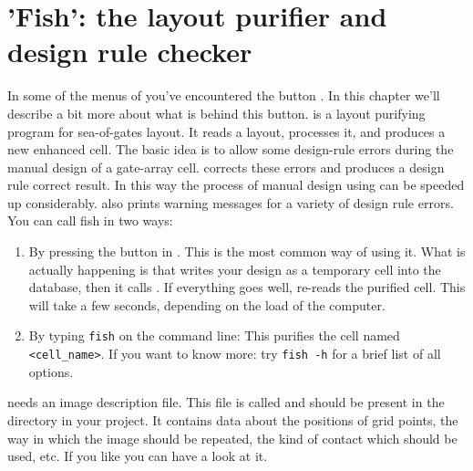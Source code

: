\chapter{'Fish': the layout purifier and design rule checker}
\label{fish}
In some of the menus of  you've encountered the button
. In this chapter we'll describe a bit more
about what is behind this button.
 is a layout purifying program for sea-of-gates layout.
It reads a layout, processes it, and produces a new enhanced cell. The
basic idea is to allow some design-rule errors during the manual design
of a gate-array cell.
 corrects these errors and produces a design rule correct result.
In this way the process of manual design using  can be
speeded up considerably.  also prints warning messages for a
variety of design rule errors.  You can call fish in two ways:
\begin{enumerate}
\item
By pressing the button  in . This is the
most common way of using it. What is actually happening is that
 writes your design as a temporary cell into the
database, then it calls . If everything goes well,
 re-reads the purified cell. This will take a few
seconds, depending on the load of the computer.
\item
By typing {\tt fish} on the command line:  This
purifies the cell named {\tt <cell\_name>}. If you want to know more:
try {\tt fish -h} for a brief list of all options.
\end{enumerate}

 needs an image description file. This file is
called  
and should be present in the directory
 in your project. It
contains data about the positions of grid points, the way in which the
image should be repeated, the kind of contact which should be used,
etc. If you like you can have a look at it.

